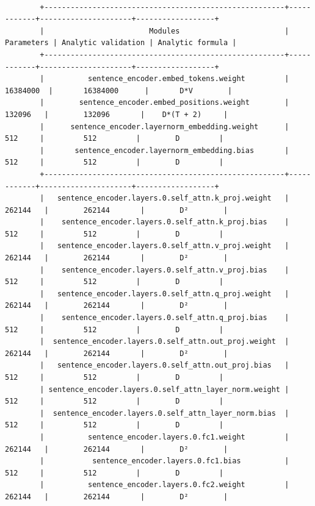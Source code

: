 \documentclass[a4paper]{article}
\begin{document}
\break 
\begin{tiny}
\begin{verbatim}

        +-------------------------------------------------------+------------+---------------------+------------------+
        |                        Modules                        | Parameters | Analytic validation | Analytic formula |
        +-------------------------------------------------------+------------+---------------------+------------------+
        |          sentence_encoder.embed_tokens.weight         |  16384000  |       16384000      |       D*V        |
        |        sentence_encoder.embed_positions.weight        |   132096   |        132096       |    D*(T + 2)     |
        |      sentence_encoder.layernorm_embedding.weight      |    512     |         512         |        D         |
        |       sentence_encoder.layernorm_embedding.bias       |    512     |         512         |        D         |
        +-------------------------------------------------------+------------+---------------------+------------------+
        |   sentence_encoder.layers.0.self_attn.k_proj.weight   |   262144   |        262144       |        D²        |
        |    sentence_encoder.layers.0.self_attn.k_proj.bias    |    512     |         512         |        D         |
        |   sentence_encoder.layers.0.self_attn.v_proj.weight   |   262144   |        262144       |        D²        |
        |    sentence_encoder.layers.0.self_attn.v_proj.bias    |    512     |         512         |        D         |
        |   sentence_encoder.layers.0.self_attn.q_proj.weight   |   262144   |        262144       |        D²        |
        |    sentence_encoder.layers.0.self_attn.q_proj.bias    |    512     |         512         |        D         |
        |  sentence_encoder.layers.0.self_attn.out_proj.weight  |   262144   |        262144       |        D²        |
        |   sentence_encoder.layers.0.self_attn.out_proj.bias   |    512     |         512         |        D         |
        | sentence_encoder.layers.0.self_attn_layer_norm.weight |    512     |         512         |        D         |
        |  sentence_encoder.layers.0.self_attn_layer_norm.bias  |    512     |         512         |        D         |
        |          sentence_encoder.layers.0.fc1.weight         |   262144   |        262144       |        D²        |
        |           sentence_encoder.layers.0.fc1.bias          |    512     |         512         |        D         |
        |          sentence_encoder.layers.0.fc2.weight         |   262144   |        262144       |        D²        |

\end{verbatim}
\end{tiny}
\end{document}
